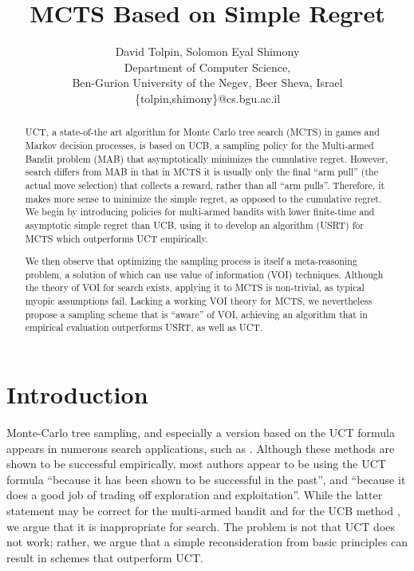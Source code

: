 \documentclass[letterpaper]{article}
\title{MCTS Based on Simple Regret}
\author {David Tolpin, Solomon Eyal Shimony \\
Department of Computer Science, \\
Ben-Gurion University of the Negev, Beer Sheva, Israel \\
\{tolpin,shimony\}@cs.bgu.ac.il}
\begin{document}
\maketitle

\begin{abstract}
UCT, a state-of-the art algorithm for Monte Carlo tree search (MCTS)
in games and Markov decision processes, is based on UCB, a sampling
policy for the Multi-armed Bandit problem (MAB) that asymptotically
minimizes the cumulative regret.  However, search differs from MAB in
that in MCTS it is usually only the final ``arm pull'' (the actual
move selection) that collects a reward, rather than all ``arm pulls''.
Therefore, it makes more sense to minimize the simple regret, as
opposed to the cumulative regret. We begin by introducing policies for
multi-armed bandits with lower finite-time and asymptotic simple
regret than UCB, using it to develop an algorithm (USRT) for MCTS
which outperforms UCT empirically.

We then observe that optimizing the sampling process is itself a
meta-reasoning problem, a solution of which can use value of
information (VOI) techniques.  Although the theory of VOI for search
exists, applying it to MCTS is non-trivial, as typical myopic
assumptions fail. Lacking a working VOI theory for MCTS, we
nevertheless propose a sampling scheme that is ``aware'' of VOI,
achieving an algorithm that in empirical evaluation outperforms USRT,
as well as UCT.
\end{abstract}

\section{Introduction}

Monte-Carlo tree sampling, and especially a version based on the
UCT formula \cite{Kocsis.uct} appears in numerous search applications,
such as \cite{Eyerich.ctp}. Although these methods are shown to be successful empirically,
most authors appear to be using the UCT formula ``because it has been shown
to be successful in the past'', and ``because it does a good job of
trading off exploration and exploitation''. While the latter statement may be
correct for the multi-armed bandit and for the UCB method \cite{Auer.ucb},
we argue that it is inappropriate for search. The problem is not that
UCT does not work; rather, we argue that a simple reconsideration from basic
principles can result in schemes that outperform UCT.
\end{document}
